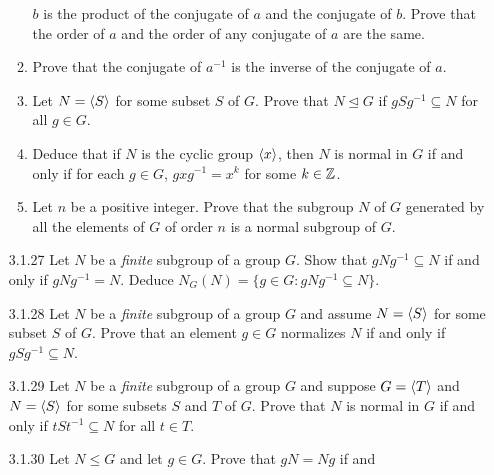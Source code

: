 \begin{enumerate}
\begin{enumerate}
                           $b$ is the product of the conjugate of $a$ and the
                           conjugate of $b$. Prove that the order of $a$ and the
                           order of any conjugate of $a$ are the same.
                     \item Prove that the conjugate of $a^{-1}$ is the inverse
                           of the conjugate of $a$.
                     \item Let $N = \langle S \rangle$ for some subset $S$ of $G$. Prove
                           that $N \trianglelefteq G$ if $gSg^{-1} \subseteq N$
                           for all $g \in G$.
                     \item Deduce that if $N$ is the cyclic group $\langle x \rangle$,
                           then $N$ is normal in $G$ if and only if for each
                           $g \in G$, $gxg^{-1} = x^k$ for some $k \in \mathbb{Z}$.
                     \item Let $n$ be a positive integer. Prove that the
                           subgroup $N$ of $G$ generated by all the elements of
                           $G$ of order $n$ is a normal subgroup of $G$.
                  \end{enumerate}
   \item[3.1.27]  Let $N$ be a \textit{finite} subgroup of a group $G$. Show
                  that $gNg^{-1} \subseteq N$ if and only if $gNg^{-1} = N$.
                  Deduce $N_G(N) = \{g \in G : gNg^{-1} \subseteq N\}$.
   \item[3.1.28]  Let $N$ be a \textit{finite} subgroup of a group $G$ and
                  assume $N = \langle S \rangle$ for some subset $S$ of $G$. Prove that an
                  element $g \in G$ normalizes $N$ if and only if
                  $gSg^{-1} \subseteq N$.
   \item[3.1.29]  Let $N$ be a \textit{finite} subgroup of a group $G$ and
                  suppose $G = \langle T \rangle$ and $N = \langle S \rangle$ for some subsets $S$
                  and $T$ of $G$. Prove that $N$ is normal in $G$ if and only if
                  $tSt^{-1} \subseteq N$ for all $t \in T$.
   \item[3.1.30]  Let $N \le G$ and let $g \in G$. Prove that $gN = Ng$ if and

\end{enumerate}
